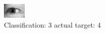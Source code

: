 \begin{figure}[h!]
\begin{center}
\includegraphics[width=0.60\columnwidth]{figures/ID3206_class_3_target_4.png}
\end{center}
\caption{ Classification: 3 actual target: 4}
\label{fig:ID3206_class_3_target_4}
\end{figure}

